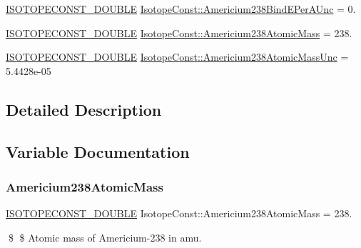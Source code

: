 \begin{DoxyCompactItemize}
\mbox{\hyperlink{group___isotope_const-_macros_ga8f45a7272ce02c0b4c65c44636ed719a}{I\+S\+O\+T\+O\+P\+E\+C\+O\+N\+S\+T\+\_\+\+D\+O\+U\+B\+LE}} \mbox{\hyperlink{group___isotope_const-_americium-_am238_gadb8646ba8810cfaa3ce1c6dfb758d1ba}{Isotope\+Const\+::\+Americium238\+Bind\+E\+Per\+A\+Unc}} = 0.
\item 
\mbox{\hyperlink{group___isotope_const-_macros_ga8f45a7272ce02c0b4c65c44636ed719a}{I\+S\+O\+T\+O\+P\+E\+C\+O\+N\+S\+T\+\_\+\+D\+O\+U\+B\+LE}} \mbox{\hyperlink{group___isotope_const-_americium-_am238_ga8c2bd201c35704d815dad433a851097b}{Isotope\+Const\+::\+Americium238\+Atomic\+Mass}} = 238.
\item 
\mbox{\hyperlink{group___isotope_const-_macros_ga8f45a7272ce02c0b4c65c44636ed719a}{I\+S\+O\+T\+O\+P\+E\+C\+O\+N\+S\+T\+\_\+\+D\+O\+U\+B\+LE}} \mbox{\hyperlink{group___isotope_const-_americium-_am238_ga105c3488e443e10b8e7c02bcf7864329}{Isotope\+Const\+::\+Americium238\+Atomic\+Mass\+Unc}} = 5.\+4428e-\/05
\end{DoxyCompactItemize}


\subsection{Detailed Description}


\subsection{Variable Documentation}
\mbox{\label{group___isotope_const-_americium-_am238_ga8c2bd201c35704d815dad433a851097b}} 
\subsubsection{\texorpdfstring{Americium238\+Atomic\+Mass}{Americium238AtomicMass}}
{\footnotesize\ttfamily \mbox{\hyperlink{group___isotope_const-_macros_ga8f45a7272ce02c0b4c65c44636ed719a}{I\+S\+O\+T\+O\+P\+E\+C\+O\+N\+S\+T\+\_\+\+D\+O\+U\+B\+LE}} Isotope\+Const\+::\+Americium238\+Atomic\+Mass = 238.}

\$ \$ Atomic mass of Americium-\/238 in amu. \mbox{\label{group___isotope_const-_americium-_am238_ga105c3488e443e10b8e7c02bcf7864329}} 
